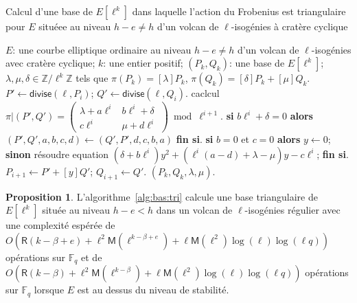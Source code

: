 \documentclass[10pt,a4paper]{book}
\theoremstyle{plain}
\theoremstyle{definition}
\theoremstyle{definition}
\theoremstyle{definition}
\newtheorem{prop}[thm]{Proposition}
\theoremstyle{definition}
\theoremstyle{remark}
\theoremstyle{remark}
\theoremstyle{definition}
\begin{document}
\begin{algorithm}
\caption{\label{alg:bas:tri}Calcul d'une base de $E[\ell^k]$ dans laquelle l'action du Frobenius est triangulaire pour $E$ situéee au niveau $h-e \neq h$ d'un volcan de $\ell$-isogénies à cratère cyclique}
\begin{algorithmic}[1]
\REQUIRE $E$: une courbe elliptique ordinaire au niveau $h-e \neq h$ d'un volcan de $\ell$-isogénies avec cratère cyclique;
$k$: une entier positif;
\ENSURE $(P_k, Q_k )$: une base de $E[\ell^k]$;
$\lambda, \mu, \delta \in \mathbb{Z}/\ell^k \mathbb{Z}$
tels que $\pi(P_k)= [\lambda] P_k$, $ \pi(Q_k)=[\delta] P_k +  [\mu] Q_k$.
\STATE\label{alg:point:divide}
  $P' \leftarrow \mathsf{divise}(\ell, P_{i})$; $Q' \leftarrow \mathsf{divise} (\ell, Q_{i})$.
\STATE\label{alg:trigonal:frobenius}
  caclcul $\pi|(P',Q')=\left( \begin{smallmatrix}
\lambda + a\ell^{i} & b\ell^{i} + \delta \\
c\ell^{i} & \mu + d\ell^{i} \end{smallmatrix} \right) \bmod {\ell^{i+1}}.$
\STATE 
  \textbf{si} $b \ell^i + \delta=0$ \textbf{alors} $(P',Q',a,b,c,d) \leftarrow (Q',P',d,c,b,a) $  \textbf{fin si}.
\STATE
  \textbf{si} $b = 0$ et $c=0$ \textbf{alors} $y \leftarrow 0$;
\STATE\label{alg:trigonal:solve1}
  \textbf{sinon} résoudre equation
 $( \delta + b \ell^i) y^2 + (\ell^i(a-d)+\lambda - \mu)y - c\ell^i $; \textbf{fin si}.
\STATE
  $P_{i+1} \leftarrow P' + [y] Q'$; $Q_{i+1} \leftarrow  Q'$.
\ENDFOR
\RETURN $(P_{k},Q_{k},\lambda,\mu).$
\end{algorithmic}
\end{algorithm}

\begin{prop}
L'algorithme~\ref{alg:bas:tri} calcule une base triangulaire de $E[\ell^k]$ située au niveau $h-e<h$ dans un volcan de $\ell$-isogénies régulier avec une complexité espérée de $O(\mathsf{R}(k-\beta+e) + \ell^2\mathsf{M}(\ell^{k-\beta+e})+ \ell\mathsf{M}(\ell^2)\log(\ell)\log(\ell q))$ opérations sur $\mathbb{F}_q$ et de $O(\mathsf{R}(k-\beta) + \ell^2\mathsf{M}(\ell^{k-\beta}) + \ell\mathsf{M}(\ell^2)\log(\ell)\log(\ell q))$ opérations sur $\mathbb{F}_q$ lorsque $E$ est au dessus du niveau de stabilité.
\end{prop}
\end{document}
